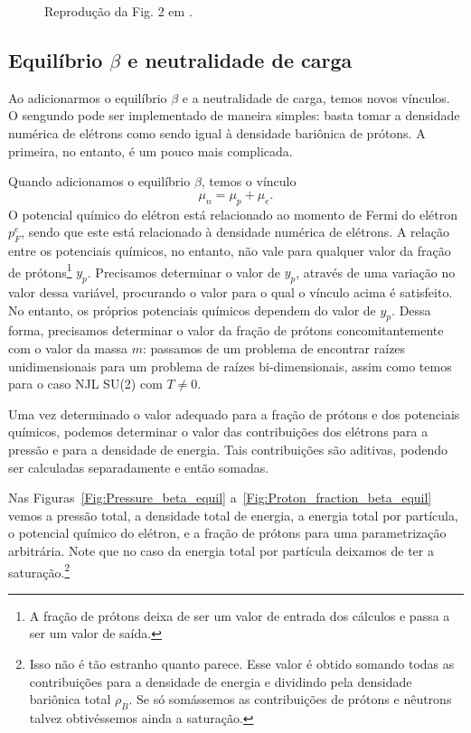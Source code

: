 \begin{figure}
	
	\caption{Reprodução da Fig. 2 em \textcite{Pais}.}
	\label{Fig:Rep_Pais_Energy_Dens}
\end{figure}

\FloatBarrier

\subsection{Equilíbrio $\beta$ e neutralidade de carga}

Ao adicionarmos o equilíbrio $\beta$ e a neutralidade de carga, temos novos vínculos. O sengundo pode ser implementado de maneira simples: basta tomar a densidade numérica de elétrons como sendo igual à densidade bariônica de prótons. A primeira, no entanto, é um pouco mais complicada. 

Quando adicionamos o equilíbrio $\beta$, temos o vínculo
\begin{equation*}
	\mu_n = \mu_p + \mu_e.
\end{equation*}
%
O potencial químico do elétron está relacionado ao momento de Fermi do elétron $p_F^e$, sendo que este está relacionado à densidade numérica de elétrons. A relação entre os potenciais químicos, no entanto, não vale para qualquer valor da fração de prótons\footnote{A fração de prótons deixa de ser um valor de entrada dos cálculos e passa a ser um valor de saída.} $y_p$. Precisamos determinar o valor de $y_p$, através de uma variação no valor dessa variável, procurando o valor para o qual o vínculo acima é satisfeito. No entanto, os próprios potenciais químicos dependem do valor de $y_p$. Dessa forma, precisamos determinar o valor da fração de prótons concomitantemente com o valor da massa $m$: passamos de um problema de encontrar raízes unidimensionais para um problema de raízes bi-dimensionais, assim como temos para o caso NJL SU(2) com $T \neq 0$.

Uma vez determinado o valor adequado para a fração de prótons e dos potenciais químicos, podemos determinar o valor das contribuições dos elétrons para a pressão e para a densidade de energia. Tais contribuições são aditivas, podendo ser calculadas separadamente e então somadas.

Nas Figuras~\ref{Fig:Pressure_beta_equil} a~\ref{Fig:Proton_fraction_beta_equil} vemos a pressão total, a densidade total de energia, a energia total por partícula, o potencial químico do elétron, e a fração de prótons para uma parametrização arbitrária. Note que no caso da energia total por partícula deixamos de ter a saturação.\footnote{Isso não é tão estranho quanto parece. Esse valor é obtido somando todas as contribuições para a densidade de energia e dividindo pela densidade bariônica total $\rho_B$. Se só somássemos as contribuições de prótons e nêutrons talvez obtivéssemos ainda a saturação.}

